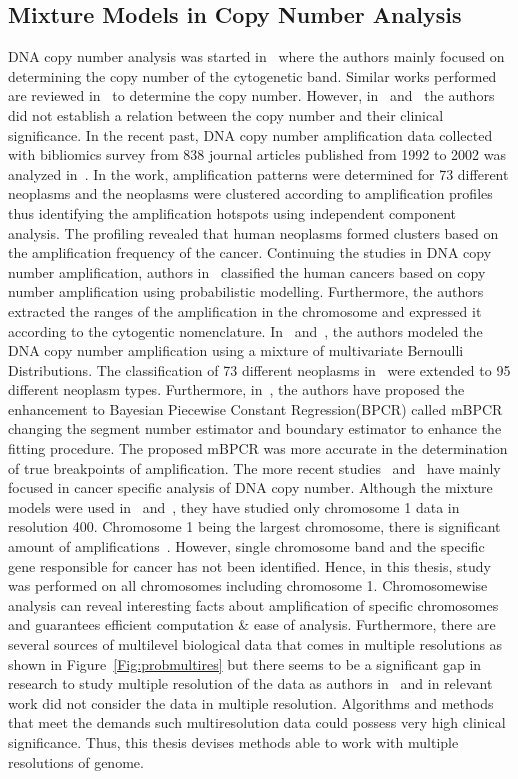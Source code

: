 \subsection{Mixture Models in Copy Number Analysis}
\label{ss:mmcna}
DNA copy number analysis was started in~\cite{pollackgenome} where the authors mainly focused on determining the copy number of the cytogenetic band. Similar works performed are reviewed in~\cite{oldage} to determine the copy number. However, in~\cite{pollackgenome} and~\cite{oldage} the authors did not establish a relation between the copy number and their clinical significance.  In the recent past, DNA copy number amplification data collected with bibliomics survey from 838 journal articles published from 1992 to 2002 was analyzed in~\cite{Myllykangas20067324}. In the work, amplification patterns were determined for 73 different neoplasms and the neoplasms were clustered according to amplification profiles thus identifying the amplification hotspots using independent component analysis. The profiling revealed that human neoplasms formed clusters based on the amplification frequency of the cancer. Continuing the studies in DNA copy number amplification, authors in~\cite{Myllykangas200815} classified the human cancers based on  copy number amplification using probabilistic modelling. Furthermore, the authors extracted the ranges of the amplification in the chromosome and expressed it according to the cytogentic nomenclature. In~\cite{Tikka2007972} and~\cite{Holl20071}, the authors modeled the DNA copy number amplification using a mixture of multivariate Bernoulli Distributions. The classification of 73 different neoplasms in~\cite{Myllykangas20067324} were extended to 95 different neoplasm types. Furthermore, in~\cite{Rancoita2009}, the authors have proposed the enhancement to Bayesian Piecewise Constant Regression(BPCR) called mBPCR changing the segment number estimator and boundary estimator to enhance the fitting procedure. The proposed mBPCR was more accurate in the determination of true breakpoints of amplification. The more recent studies~\cite{Dhaene2010262} and~\cite{Despierre2010358} have mainly focused in cancer specific analysis of DNA copy number. Although the mixture models were used in~\cite{Tikka2007972} and~\cite{Holl20071}, they have studied only chromosome 1 data in resolution 400. Chromosome 1 being the largest chromosome, there is significant amount of amplifications~\cite{Myllykangas20067324}. However, single chromosome band and the specific gene responsible for cancer has not been identified. Hence, in this thesis, study was performed on all chromosomes including chromosome 1. Chromosomewise analysis can reveal interesting facts about amplification of specific chromosomes and guarantees efficient computation \& ease of analysis. Furthermore, there are several sources of multilevel biological data that comes in multiple resolutions as shown in Figure~\ref{Fig:probmultires} but there seems to be a significant gap in research to study multiple resolution of the data as authors in~\cite{Myllykangas20067324} and in relevant work did not consider the data in multiple resolution. Algorithms and methods that meet the demands such multiresolution data could possess very high clinical significance. Thus, this thesis devises methods able to work with multiple resolutions of genome.




